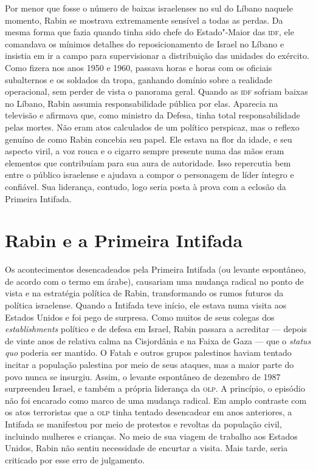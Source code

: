 Por menor que fosse o número de baixas israelenses no sul do Líbano
naquele momento, Rabin se mostrava extremamente sensível a todas as
perdas. Da mesma forma que fazia quando tinha sido chefe do Estado"-Maior
das \textsc{idf}, ele comandava os mínimos detalhes do reposicionamento de Israel
no Líbano e insistia em ir a campo para supervisionar a distribuição das
unidades do exército. Como fizera nos anos 1950 e 1960, passava horas e
horas com os oficiais subalternos e os soldados da tropa, ganhando
domínio sobre a realidade operacional, sem perder de vista o panorama
geral. Quando as \textsc{idf} sofriam baixas no Líbano, Rabin assumia
responsabilidade pública por elas. Aparecia na televisão e afirmava que,
como ministro da Defesa, tinha total responsabilidade pelas mortes. Não
eram atos calculados de um político perspicaz, mas o reflexo genuíno de
como Rabin concebia seu papel. Ele estava na flor da idade, e seu
aspecto viril, a voz rouca e o cigarro sempre presente numa das mãos
eram elementos que contribuíam para sua aura de autoridade. Isso
repercutia bem entre o público israelense e ajudava a compor o
personagem de líder íntegro e confiável. Sua liderança, contudo, logo
seria posta à prova com a eclosão da Primeira Intifada.

\section{Rabin e a Primeira Intifada}

Os acontecimentos desencadeados pela Primeira Intifada (ou levante
espontâneo, de acordo com o termo em árabe), causariam uma mudança
radical no ponto de vista e na estratégia política de Rabin,
transformando os rumos futuros da política israelense. Quando a Intifada
teve início, ele estava numa visita aos Estados Unidos e foi pego de
surpresa. Como muitos de seus colegas dos \emph{establishments} político
e de defesa em Israel, Rabin passara a acreditar --- depois de vinte anos
de relativa calma na Cisjordânia e na Faixa de Gaza --- que o \emph{status quo}
poderia ser mantido. O Fatah e outros grupos palestinos haviam tentado
incitar a população palestina por meio de seus ataques, mas a maior
parte do povo nunca se insurgiu. Assim, o levante espontâneo de dezembro
de 1987 surpreendeu Israel, e também a própria liderança da \textsc{olp}. A
princípio, o episódio não foi encarado como marco de uma mudança radical. Em
amplo contraste com os atos terroristas que a \textsc{olp} tinha tentado
desencadear em anos anteriores, a Intifada se manifestou por meio de
protestos e revoltas da população civil, incluindo mulheres e
crianças. No meio de sua viagem de trabalho aos Estados Unidos, Rabin
não sentiu necessidade de encurtar a visita. Mais tarde, seria criticado
por esse erro de julgamento.

